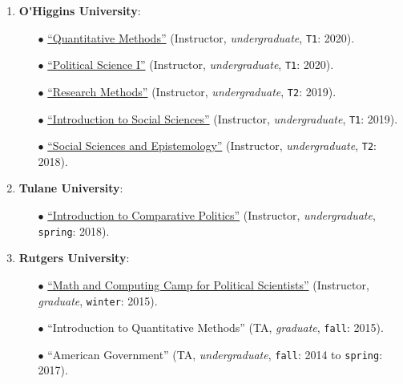 \begin{enumerate}

\item {\bf O\'\unskip Higgins University}:
  
    \begin{itemize}
      \item[$\bullet$] \href{https://github.com/hbahamonde/Metodos_Cuanti_I/raw/master/Bahamonde_Metodos_Cuanti_I.pdf}{``Quantitative Methods''} (Instructor, \emph{undergraduate}, \texttt{T1}: 2020).
      \item[$\bullet$] \href{https://github.com/hbahamonde/Ciencia_Politica_I/raw/master/Bahamonde_Ciencia_Politica_I.pdf}{``Political Science I''} (Instructor, \emph{undergraduate}, \texttt{T1}: 2020).
      \item[$\bullet$] \href{https://github.com/hbahamonde/Metodos_de_Investigacion/raw/master/Bahamonde_Metodos_de_Investigacion.pdf}{``Research Methods''} (Instructor, \emph{undergraduate}, \texttt{T2}: 2019).
      \item[$\bullet$] \href{https://github.com/hbahamonde/Intro_Ciencias_Sociales/raw/master/Bahamonde_Intro_Ciencias_Sociales.pdf}{``Introduction to Social Sciences''} (Instructor, \emph{undergraduate}, \texttt{T1}: 2019).
      \item[$\bullet$] \href{https://github.com/hbahamonde/Social_Sciences_Epistemology_UGRAD/raw/master/Bahamonde_Social_Sciences_Epistemology_UGRAD_Syllabus.pdf}{``Social Sciences and Epistemology''} (Instructor, \emph{undergraduate}, \texttt{T2}: 2018).
    \end{itemize}

\item {\bf Tulane University}:
  
    \begin{itemize}
      \item[$\bullet$] \href{https://github.com/hbahamonde/Comparative_Politics_UGRAD/raw/master/Bahamonde_Comparative_Politics_Syllabus_UGRAD.pdf}{``Introduction to Comparative Politics''} (Instructor, \emph{undergraduate}, \texttt{spring}: 2018).
    \end{itemize}

\item {\bf Rutgers University}:

    \begin{itemize}
      \item[$\bullet$] \href{http://github.com/hbahamonde/Math-Camp/raw/master/Syllabus/Math_Camp_Syllabus.pdf/}{``Math and Computing Camp for Political Scientists''} (Instructor, \emph{graduate}, \texttt{winter}: 2015).
      
      \item[$\bullet$] ``Introduction to Quantitative Methods'' (TA, \emph{graduate}, \texttt{fall}: 2015).
      
      \item[$\bullet$] ``American Government'' (TA, \emph{undergraduate}, \texttt{fall}: 2014 to \texttt{spring}: 2017).
    \end{itemize}

\end{enumerate}